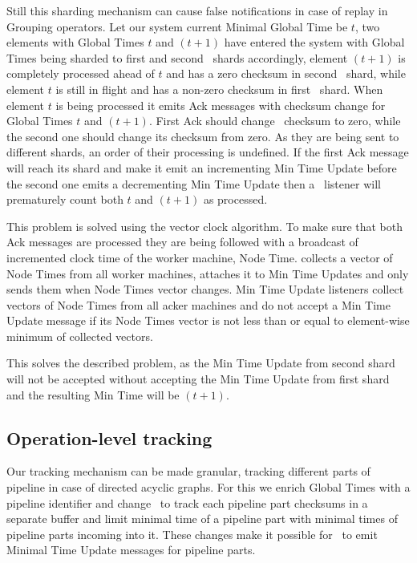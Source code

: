 Still this sharding mechanism can cause false notifications in case of replay in Grouping operators. Let our system current Minimal Global Time be $t$, two elements with Global Times $t$ and $(t+1)$ have entered the system with Global Times being sharded to first and second \tracker\ shards accordingly, element $(t+1)$ is completely processed ahead of $t$ and has a zero checksum in second \tracker\ shard, while element $t$ is still in flight and has a non-zero checksum in first \tracker\ shard. When element $t$ is being processed it emits Ack messages with checksum change for Global Times $t$ and $(t+1)$. First Ack should change \tracker\ checksum to zero, while the second one should change its checksum from zero. As they are being sent to different shards, an order of their processing is undefined. If the first Ack message will reach its shard and make it emit an incrementing Min Time Update before the second one emits a decrementing Min Time Update then a \tracker\ listener will prematurely count both $t$ and $(t+1)$ as processed.

This problem is solved using the vector clock algorithm. To make sure that both Ack messages are processed they are being followed with a broadcast of incremented clock time of the worker machine, Node Time. \tracker collects a vector of Node Times from all worker machines, attaches it to Min Time Updates and only sends them when Node Times vector changes. Min Time Update listeners collect vectors of Node Times from all acker machines and do not accept a Min Time Update message if its Node Times vector is not less than or equal to element-wise minimum of collected vectors.

This solves the described problem, as the Min Time Update from second shard will not be accepted without accepting the Min Time Update from first shard and the resulting Min Time will be $(t+1)$.

\subsection{Operation-level tracking}

Our tracking mechanism can be made granular, tracking different parts of pipeline in case of directed acyclic graphs. For this we enrich Global Times with a pipeline identifier and change \tracker\ to track each pipeline part checksums in a separate buffer and limit minimal time of a pipeline part with minimal times of pipeline parts incoming into it. These changes make it possible for \tracker\ to emit Minimal Time Update messages for pipeline parts.
